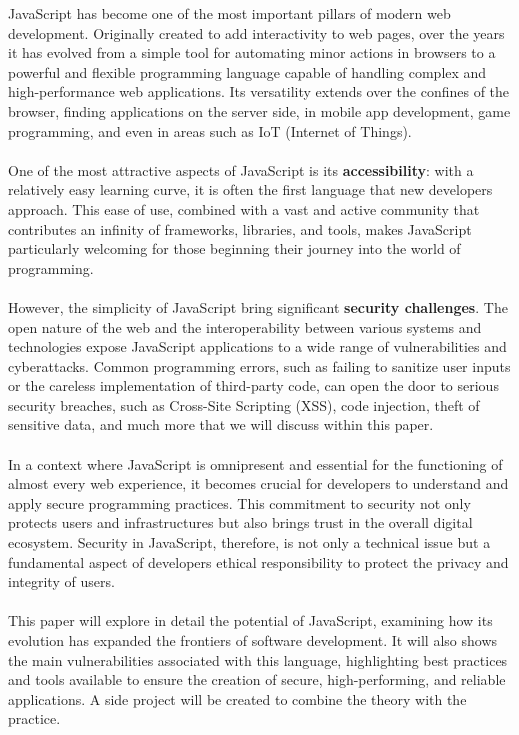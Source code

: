 \documentclass{article}
\begin{document}
JavaScript has become one of the most important pillars of modern web development. Originally created to add interactivity to web pages, over the years it has evolved from a simple tool for automating minor actions in browsers to a powerful and flexible programming language capable of handling complex and high-performance web applications. Its versatility extends over the confines of the browser, finding applications on the server side, in mobile app development, game programming, and even in areas such as IoT (Internet of Things).
\\
\\
One of the most attractive aspects of JavaScript is its \textbf{accessibility}: with a relatively easy learning curve, it is often the first language that new developers approach. This ease of use, combined with a vast and active community that contributes an infinity of frameworks, libraries, and tools, makes JavaScript particularly welcoming for those beginning their journey into the world of programming.
\\
\\
However, the simplicity of JavaScript bring significant \textbf{security challenges}. The open nature of the web and the interoperability between various systems and technologies expose JavaScript applications to a wide range of vulnerabilities and cyberattacks. Common programming errors, such as failing to sanitize user inputs or the careless implementation of third-party code, can open the door to serious security breaches, such as Cross-Site Scripting (XSS), code injection, theft of sensitive data, and much more that we will discuss within this paper.
\\
\\
In a context where JavaScript is omnipresent and essential for the functioning of almost every web experience, it becomes crucial for developers to understand and apply secure programming practices. This commitment to security not only protects users and infrastructures but also brings trust in the overall digital ecosystem. Security in JavaScript, therefore, is not only a technical issue but a fundamental aspect of developers ethical responsibility to protect the privacy and integrity of users.
\\
\\
This paper will explore in detail the potential of JavaScript, examining how its evolution has expanded the frontiers of software development. It will also shows the main vulnerabilities associated with this language, highlighting best practices and tools available to ensure the creation of secure, high-performing, and reliable applications. A side project will be created to combine the theory with the practice.
\end{document}
